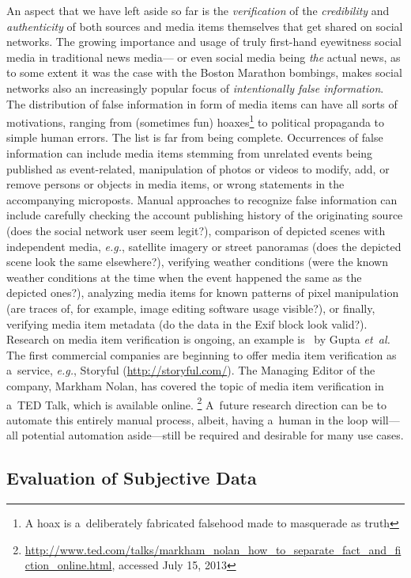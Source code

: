 An aspect that we have left aside so far is the \emph{verification}
of the \emph{credibility} and \emph{authenticity} of both sources
and media items themselves that get shared on social networks.
The growing importance and usage of truly first-hand eyewitness
social media in traditional news media---%
or even social media being \emph{the} actual news,
as to some extent it was the case with the Boston Marathon bombings,
makes social networks also an increasingly popular focus of \emph{intentionally false information}.
The distribution of false information in form of media items
can have all sorts of motivations, ranging from (sometimes fun)
hoaxes\footnote{A hoax is a~deliberately fabricated falsehood made to masquerade as truth}
to political propaganda to simple human errors.
The list is far from being complete.
Occurrences of false information can include
media items stemming from unrelated events being published as event-related,
manipulation  of photos or videos to modify, add, or remove persons or objects in media items,
or wrong statements in the accompanying microposts.
Manual approaches to recognize false information 
can include carefully checking the account publishing history
of the originating source (does the social network user seem legit?),
comparison of depicted scenes with independent media,
\emph{e.g.}, satellite imagery or street panoramas
(does the depicted scene look the same elsewhere?),
verifying weather conditions
(were the known weather conditions at the time
when the event happened the same as the depicted ones?),
analyzing media items for known patterns of pixel manipulation
(are traces of, for example, image editing software usage visible?),
or finally, verifying media item metadata
(do the data in the Exif block look valid?).
Research on media item verification is ongoing,
an example is~\cite{gupta2013fakingsandy} by Gupta \emph{et~al.}
The first commercial companies are beginning to offer media item 
verification as a~service, \emph{e.g.}, Storyful (\url{http://storyful.com/}).
The Managing Editor of the company, Markham Nolan,
has covered the topic of media item verification
in a~TED Talk, which is available online.%
\footnote{\url{http://www.ted.com/talks/markham_nolan_how_to_separate_fact_and_fiction_online.html},
accessed July 15, 2013}
A~future research direction can be to automate
this entirely manual process, albeit, having a~human in the loop
will---all potential automation aside---still be required
and desirable for many use cases.

\subsection{Evaluation of Subjective Data}

